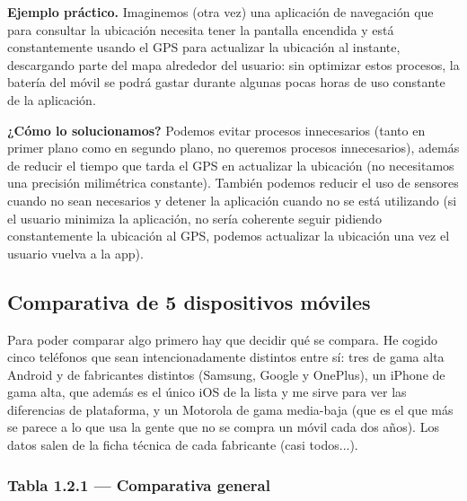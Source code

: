 \documentclass[11pt,a4paper]{article}
\newcommand{\campo}[1]{\textbf{\color{ink}#1}}
\begin{document}
	\campo{Ejemplo práctico.}
	Imaginemos (otra vez) una aplicación de navegación que para consultar la ubicación necesita tener la pantalla encendida y está constantemente usando el GPS para actualizar la ubicación al instante, descargando parte del mapa alrededor del usuario: sin optimizar estos procesos, la batería del móvil se podrá gastar durante algunas pocas horas de uso constante de la aplicación.
	
	\campo{¿Cómo lo solucionamos?}
	Podemos evitar procesos innecesarios (tanto en primer plano como en segundo plano, no queremos procesos innecesarios), además de reducir el tiempo que tarda el GPS en actualizar la ubicación (no necesitamos una precisión milimétrica constante). También podemos reducir el uso de sensores cuando no sean necesarios y detener la aplicación cuando no se está utilizando (si el usuario minimiza la aplicación, no sería coherente seguir pidiendo constantemente la ubicación al GPS, podemos actualizar la ubicación una vez el usuario vuelva a la app).
	
	\subsection{Comparativa de 5 dispositivos móviles}
	
	Para poder comparar algo primero hay que decidir qué se compara. He cogido cinco teléfonos que sean intencionadamente distintos entre sí: tres de gama alta Android y de fabricantes distintos (Samsung, Google y OnePlus), un iPhone de gama alta, que además es el único iOS de la lista y me sirve para ver las diferencias de plataforma, y un Motorola de gama media-baja (que es el que más se parece a lo que usa la gente que no se compra un móvil cada dos años). Los datos salen de la ficha técnica de cada fabricante (casi todos...).
	
	\subsubsection*{Tabla 1.2.1 --- Comparativa general}
	
\end{document}

